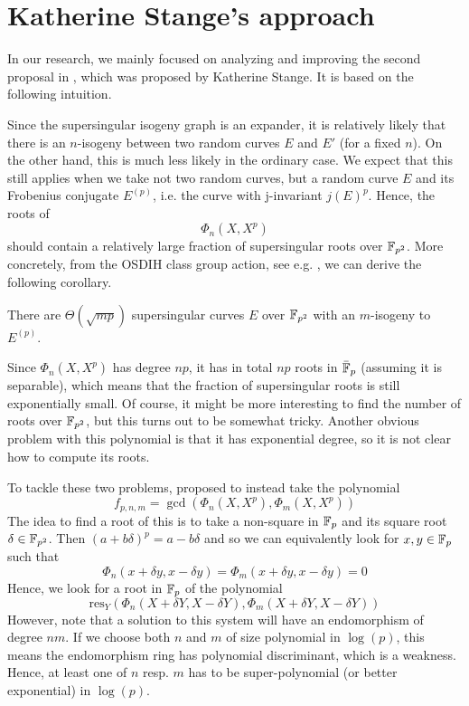 \section{Katherine Stange's approach}
In our research, we mainly focused on analyzing and improving the second proposal in \cite{base_paper}, which was proposed by Katherine Stange.
It is based on the following intuition.

Since the supersingular isogeny graph is an expander, it is relatively likely that there is an $n$-isogeny between two random curves $E$ and $E'$ (for a fixed $n$).
On the other hand, this is much less likely in the ordinary case.
We expect that this still applies when we take not two random curves, but a random curve $E$ and its Frobenius conjugate $E^{(p)}$, i.e. the curve with j-invariant $j(E)^p$.
Hence, the roots of
\begin{equation*}
    \Phi_n(X, X^p)
\end{equation*}
should contain a relatively large fraction of supersingular roots over $\mathbb{F}_{p^2}$.
More concretely, from the OSDIH class group action, see e.g. \cite[Thm~4.3]{chenu_smith}, we can derive the following corollary.
\begin{corollary}
    \label{prop:osidh_class_group_action}
    There are $\Theta(\sqrt{mp})$ supersingular curves $E$ over $\mathbb{F}_{p^2}$ with an $m$-isogeny to $E^{(p)}$.
\end{corollary}
Since $\Phi_n(X, X^p)$ has degree $np$, it has in total $np$ roots in $\bar{\mathbb{F}}_p$ (assuming it is separable), which means that the fraction of supersingular roots is still exponentially small.
Of course, it might be more interesting to find the number of roots over $\mathbb{F}_{p^2}$, but this turns out to be somewhat tricky.
Another obvious problem with this polynomial is that it has exponential degree, so it is not clear how to compute its roots.

To tackle these two problems, \cite{base_paper} proposed to instead take the polynomial
\begin{equation*}
    f_{p, n, m} = \gcd(\Phi_n(X, X^p), \Phi_m(X, X^p))
\end{equation*}
The idea to find a root of this is to take a non-square in $\mathbb{F}_p$ and its square root $\delta \in \mathbb{F}_{p^2}$.
Then $(a + b\delta)^p = a - b\delta$ and so we can equivalently look for $x, y \in \mathbb{F}_p$ such that
\begin{equation*}
    \Phi_n(x + \delta y, x - \delta y) = \Phi_m(x + \delta y, x - \delta y) = 0
\end{equation*}
Hence, we look for a root in $\mathbb{F}_p$ of the polynomial
\begin{equation*}
    \mathrm{res}_Y(\Phi_n(X + \delta Y, X - \delta Y), \Phi_m(X + \delta Y, X - \delta Y))
\end{equation*}
However, note that a solution to this system will have an endomorphism of degree $nm$.
If we choose both $n$ and $m$ of size polynomial in $\log(p)$, this means the endomorphism ring has polynomial discriminant, which is a weakness.
Hence, at least one of $n$ resp. $m$ has to be super-polynomial (or better exponential) in $\log(p)$.

